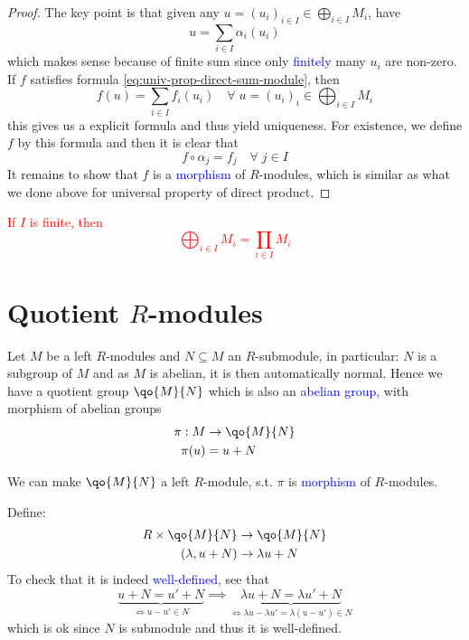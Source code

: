 \begin{proof}
	The key point is that given any \( u = (u_i)_{i\in I} \in \bigoplus_{i\in I}M_i \), have
	\[
		u = \sum_{i\in I} \alpha_i (u_i)
	\]
	which makes sense because of finite sum since only \textcolor{blue}{finitely} many \( u_i \) are
	non-zero. If \( f \) satisfies formula \ref{eq:univ-prop-direct-sum-module}, then
	\[
		f(u) = \sum_{i\in I}f_i(u_i) \quad \forall \; u = (u_i)_i \in \bigoplus_{i\in I}M_i
	\]
	this gives us a explicit formula and thus yield uniqueness. For existence, we define \( f \) by
	this formula and then it is clear that
	\[
		f \circ \alpha_j = f_j \quad \forall \; j \in I
	\]
	It remains to show that \( f \) is a \textcolor{blue}{morphism} of \( R \)-modules, which is
	similar as what we done above for universal property of direct product.
\end{proof}

\begin{note}
	\textcolor{red}{If \( I \) is finite, then
		\[
			\bigoplus_{i\in I} M_i = \prod_{i\in I} M_i
		\]
	}
\end{note}

\section{Quotient \( R \)-modules}
Let \( M \) be a left \( R \)-modules and \( N \subseteq M \) an \( R \)-submodule, in particular:
\( N \) is a subgroup of \( M \) and as \( M \) is abelian, it is then automatically normal. Hence
we have a quotient group \( \qo{M}{N} \) which is also an \textcolor{blue}{abelian group}, with
morphism of abelian groups
\[
	\begin{aligned}
		\pi : M & \to \qo{M}{N} \\
		\pi(u)  & = u + N
	\end{aligned}
\]

\begin{claim}
	We can make \( \qo{M}{N} \) a left \( R \)-module, s.t. \( \pi \) is \textcolor{blue}{morphism} of
	\( R \)-modules.
\end{claim}
Define:
\[
	\begin{aligned}
		R \times \qo{M}{N} & \to \qo{M}{N}     \\
		(\lambda, u + N)   & \to \lambda u + N
	\end{aligned}
\]
To check that it is indeed \textcolor{blue}{well-defined}, see that
\[
	\underbrace{u + N = u' + N}_{\iff u - u' \in N} \implies \underbrace{\lambda u + N = \lambda u' +
		N}_{\iff \lambda u - \lambda u'= \lambda (u-u') \in N}
\]
which is ok since \( N \) is submodule and thus it is well-defined.

